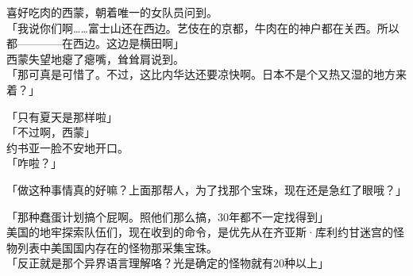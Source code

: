 喜好吃肉的西蒙，朝着唯一的女队员问到。\\

「我说你们啊……富士山还在西边。艺伎在的京都，牛肉在的神户都在关西。所以都————在西边。这边是横田啊」\\

西蒙失望地瘪了瘪嘴，耸耸肩说到。\\

「那可真是可惜了。不过，这比内华达还要凉快啊。日本不是个又热又湿的地方来着？」

「只有夏天是那样啦」\\

「不过啊，西蒙」\\

约书亚一脸不安地开口。\\

「咋啦？」

「做这种事情真的好嘛？上面那帮人，为了找那个宝珠，现在还是急红了眼哦？」

「那种蠢蛋计划搞个屁啊。照他们那么搞，30年都不一定找得到」\\

美国的地牢探索队伍们，现在收到的命令，是优先从在齐亚斯·库利约甘迷宫的怪物列表中美国国内存在的怪物那采集宝珠。\\

「反正就是那个异界语言理解咯？光是确定的怪物就有20种以上」

